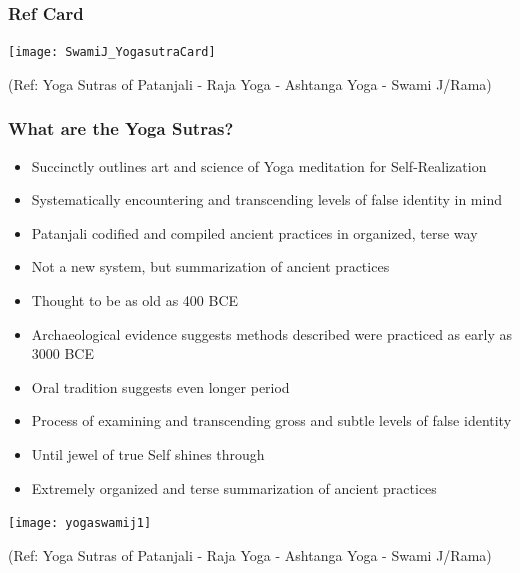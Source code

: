 \begin{frame}[fragile]\frametitle{Ref Card}

\begin{center}
\texttt{[image: SwamiJ\_YogasutraCard]}

\end{center}

  
  \tiny{(Ref: Yoga Sutras of Patanjali - Raja Yoga - Ashtanga Yoga - Swami J/Rama)}

\end{frame}


\begin{frame}[fragile]\frametitle{What are the Yoga Sutras?}

\begin{itemize}
\item Succinctly outlines art and science of Yoga meditation for Self-Realization
\item Systematically encountering and transcending levels of false identity in mind
\item Patanjali codified and compiled ancient practices in organized, terse way
\item Not a new system, but summarization of ancient practices
\item Thought to be as old as 400 BCE
\item Archaeological evidence suggests methods described were practiced as early as 3000 BCE
\item Oral tradition suggests even longer period
\item Process of examining and transcending gross and subtle levels of false identity
\item Until jewel of true Self shines through
\item Extremely organized and terse summarization of ancient practices
\end{itemize}

\begin{center}
\texttt{[image: yogaswamij1]}

\end{center}

  
  \tiny{(Ref: Yoga Sutras of Patanjali - Raja Yoga - Ashtanga Yoga - Swami J/Rama)}

\end{frame}

